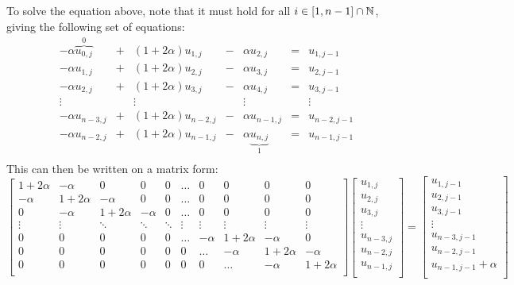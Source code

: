 \documentclass[12pt,english,a4paper]{article}
\begin{document}
To solve the equation above, note that it must hold for all \(i\in\qty[1,n-1]\cap\mathbb{N}\), giving the following set of equations:
\[
    \begin{array}{ccccccc}
        -\alpha \overbrace{u_{0,j}}^0 &+& (1+2\alpha)u_{1,j} &-& \alpha u_{2,j} &=& u_{1,j-1}\\
        -\alpha u_{1,j} &+& (1+2\alpha)u_{2,j} &-& \alpha u_{3,j} &=& u_{2,j-1}\\
        -\alpha u_{2,j} &+& (1+2\alpha)u_{3,j} &-& \alpha u_{4,j} &=& u_{3,j-1}\\
        \vdots && \vdots && \vdots && \vdots\\
        -\alpha u_{n-3,j} &+& (1+2\alpha)u_{n-2,j} &-& \alpha u_{n-1,j} &=& u_{n-2,j-1}\\
        -\alpha u_{n-2,j} &+& (1+2\alpha)u_{n-1,j} &-& \alpha \underbrace{u_{n,j}}_1 &=& u_{n-1,j-1}\\
    \end{array}
\]
This can then be written on a matrix form:
\[
    \begin{bmatrix}
        1 + 2\alpha & -\alpha & 0 & 0 & 0 & \dots & 0 & 0 & 0 & 0  \\
        -\alpha & 1+2\alpha & -\alpha & 0 & 0 & \dots & 0 & 0 & 0 & 0  \\
        0 & -\alpha & 1+2\alpha & -\alpha & 0 & \dots & 0 & 0 & 0 & 0 \\
        \vdots & \vdots &  \ddots & \ddots & \ddots & \vdots & \vdots & \vdots & \vdots & \vdots\\
        0 & 0 & 0 & 0 & 0 & \dots & -\alpha & 1+2\alpha & - \alpha & 0\\
        0 & 0 & 0 & 0 & 0 & 0 & \dots & -\alpha & 1+2\alpha & - \alpha\\
        0 & 0 & 0 & 0 & 0 & 0 & 0 & \dots & -\alpha & 1+2\alpha\\
    \end{bmatrix}
    \begin{bmatrix}
        u_{1,j}\\
        u_{2,j}\\
        u_{3,j}\\
        \vdots\\
        u_{n-3,j}\\
        u_{n-2,j}\\
        u_{n-1,j}\\
    \end{bmatrix}
    =
    \begin{bmatrix}
        u_{1,j-1}\\
        u_{2,j-1}\\
        u_{3,j-1}\\
        \vdots\\
        u_{n-3,j-1}\\
        u_{n-2,j-1}\\
        u_{n-1,j-1} + \alpha\\
    \end{bmatrix}
\]
\end{document}
